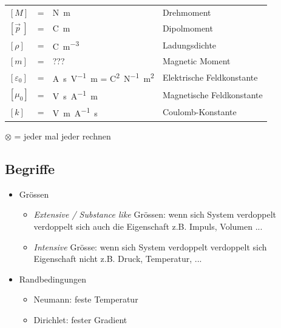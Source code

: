\documentclass[a4paper, 10pt]{scrartcl}
\begin{document}
\begin{tabularx}{\linewidth}{lclX}
		$[M]$ &=& \si{\newton\meter} & Drehmoment \\
		$[\vec{p}\:]$ &=& \si{\coulomb\meter} & Dipolmoment \\
		$[\rho]$ &=& \si{\coulomb\per\meter\tothe{3}} & Ladungsdichte \\
		$[m]$ &=& ??? & Magnetic Moment \\
		$[\varepsilon_0]$ &=& \si{\ampere\second\per\volt\meter} = \si{\square\coulomb\per\newton\square\meter} & Elektrische Feldkonstante \\
		$[\mu_0]$ &=& \si{\volt\second\per\ampere\meter} & Magnetische Feldkonstante \\
		$[k]$ &=& \si{\volt\meter\per\ampere\second} & Coulomb-Konstante \\
	\end{tabularx}
	
	$ \otimes $ = jeder mal jeder rechnen
	
	
	
	
	\subsection{Begriffe}
	\begin{multicols}{2}
		\begin{itemize}
			\item Grössen
			\begin{itemize}
				\item \emph{Extensive / Substance like } Grössen: wenn sich System verdoppelt verdoppelt sich auch die Eigenschaft z.B. Impuls, Volumen ...    
				\item \emph{Intensive} Grösse: wenn sich System verdoppelt verdoppelt sich Eigenschaft nicht z.B. Druck, Temperatur, ...
			\end{itemize}
			\vfill\columnbreak
			\item Randbedingungen
			\begin{itemize}
				\item Neumann: feste Temperatur
				\item Dirichlet: fester Gradient
			\end{itemize}
		\end{itemize}
	\end{multicols}
	
	
\end{document}
